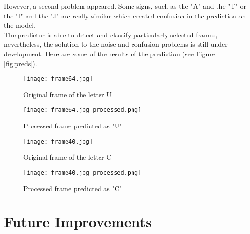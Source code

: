 \documentclass[9pt,a4paper,twoside]{tau-class/tau}
\begin{document}
    However, a second problem appeared. Some signs, such as the "A" and the "T" or the "I" and the "J" are really similar which created confusion in the prediction on the model.\\

    The predictor is able to detect and classify particularly selected frames, nevertheless, the solution to the noise and confusion problems is still under development.
    Here are some of the results of the prediction (see Figure \ref{fig:preds}).
    \begin{figure*}[b] %
        \centering
        \begin{subfigure}[b]{0.2\linewidth} %
            \texttt{[image: frame64.jpg]} %
            \caption{Original frame of the letter U}
            \label{fig:frameu}
        \end{subfigure}
            \hspace{20pt}   %
        \begin{subfigure}[b]{0.2\linewidth} %
            \texttt{[image: frame64.jpg\_processed.png]}
            \caption{Processed frame predicted as "U"}
            \label{fig:predu}
        \end{subfigure}
            \hspace{20pt}
        \begin{subfigure}[b]{0.2\linewidth} %
            \texttt{[image: frame40.jpg]} %
            \caption{Original frame of the letter C}
            \label{fig:framec}
        \end{subfigure}
            \hspace{20pt}   %
        \begin{subfigure}[b]{0.2\linewidth} %
            \texttt{[image: frame40.jpg\_processed.png]}
            \caption{Processed frame predicted as "C"}
            \label{fig:predc}
        \end{subfigure}
        
        \caption{Image predictions of the video}
        \label{fig:preds}
    \end{figure*}
    

	
\section{Future Improvements}
\end{document}
